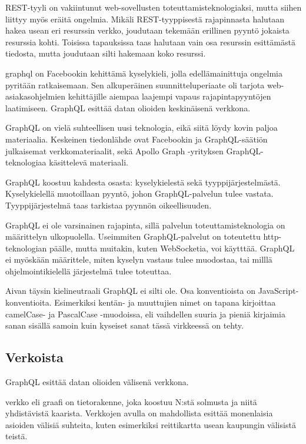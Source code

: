 REST-tyyli on vakiintunut web-sovellusten toteuttamisteknologiaksi,
mutta siihen liittyy myös eräitä ongelmia. Mikäli REST-tyyppisestä
rajapinnasta halutaan hakea usean eri resurssin verkko, joudutaan
tekemään erillinen pyyntö jokaista resurssia kohti. Toisissa tapauksissa
taas halutaan vain osa resurssin esittämästä tiedosta, mutta joudutaan
silti hakemaan koko
resurssi.\cite{betterRESTPrisma}\cite{WhyUseGraphQLApollo}

\gls{graphql} on Facebookin kehittämä kyselykieli, jolla
edellämainittuja ongelmia pyritään ratkaisemaan. Sen alkuperäinen
suunnitteluperiaate oli tarjota web-asiakasohjelmien kehittäjille
aiempaa laajempi vapaus rajapintapyyntöjen laatimiseen. GraphQL esittää
datan olioiden keskinäisenä verkkona. \cite{graphql:spec}

GraphQL on vielä suhteellisen uusi teknologia, eikä siitä löydy kovin
paljoa materiaalia. Keskeinen tiedonlähde ovat
Facebookin\cite{graphql:spec} ja GraphQL-säätiön\cite{GraphQLOrg}
julkaisemat verkkomateriaalit, sekä Apollo Graph -yrityksen
GraphQL-teknologiaa käsittelevä materiaali.\cite{ApolloGraphQL}

GraphQL koostuu kahdesta osasta: kyselykielestä sekä
tyyppijärjestelmästä. Kyselykielellä muotoillaan pyyntö, johon
GraphQL-palvelun tulee vastata. Tyyppijärjestelmä taas tarkistaa pyynnön
oikeellisuuden.

GraphQL ei ole varsinainen rajapinta, sillä palvelun
toteuttamisteknologia on määrittelyn ulkopuolella. Useimmiten
GraphQL-palvelut on toteutettu \gls{http}-teknologian päälle, mutta
muitakin, kuten WebSocketia, voi käytttää. GraphQL ei myöskään
määrittele, miten kyselyn vastaus tulee muodostaa, tai milllä
ohjelmointikielellä järjestelmä tulee toteuttaa.

Aivan täysin kielineutraali GraphQL ei silti ole. Osa konventioista on
JavaScript-konventioita. Esimerkiksi kentän- ja muuttujien nimet on
tapana kirjoittaa camelCase- ja PascalCase -muodoissa, eli vaihdellen
suuria ja pieniä kirjaimia sanan sisällä samoin kuin kyseiset sanat
tässä virkkeessä on tehty.\cite{GraphQLSchemaBasics}

\hypertarget{verkoista}{%
\subsection{Verkoista}\label{verkoista}}

GraphQL esittää datan olioiden välisenä verkkona.

\gls{verkko} eli graafi on tietorakenne, joka koostuu N:stä solmusta ja
niitä yhdistävistä kaarista.\cite{pozrikidis2014introduction} Verkkojen
avulla on mahdollista esittää monenlaisia asioiden välisiä suhteita,
kuten esimerkiksi reittikartta usean kaupungin välisistä teistä.

